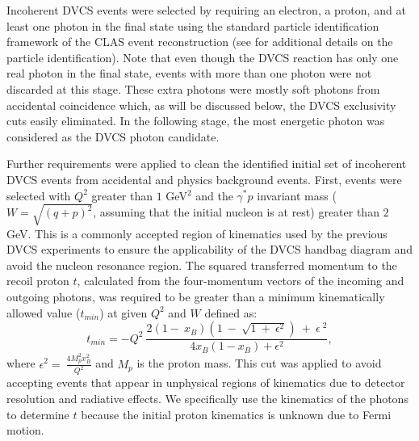 \documentclass[twocolumn,nofootinbib,prl,superscriptaddress,secnumarabic,amssymb,nobibnotes,aps,floatfix]{revtex4}
\begin{document}
Incoherent DVCS events were selected by requiring an electron, a proton, and at 
least one photon in the final state using the standard particle identification 
framework of the CLAS event reconstruction (see \cite{Hattawy:thesis} for 
additional details on the particle identification). Note that even though the 
DVCS reaction has only one real photon in the final state, events with more 
than one photon were not discarded at this stage. These extra photons were 
mostly soft photons from accidental coincidence which, as will be discussed 
below, the DVCS exclusivity cuts easily eliminated.  In the following 
stage, the most energetic photon was considered as the DVCS photon candidate.

Further requirements were applied to clean the identified initial set of 
incoherent DVCS events from accidental and physics background events. 
First, events were selected with $Q^2$ greater than $1$ GeV$^2$ and the 
$\gamma^*p$ invariant mass ($W=\sqrt{(q+p)^2}$, assuming that the initial 
nucleon is at rest) greater than $2$ GeV. This is a commonly accepted region of 
kinematics used by the previous DVCS experiments to ensure the applicability of 
the DVCS handbag diagram and avoid the nucleon resonance region. The squared 
transferred momentum to the recoil proton $t$, calculated from the 
four-momentum vectors of the incoming and outgoing photons, was required to be 
greater than a minimum kinematically allowed value ($t_{min}$) at given $Q^2$ 
and $W$ defined as: \begin{equation}
t_{min} 
   =-Q^{2}~\frac{2(1-~x_{B})(1~-~\sqrt{1~+~\epsilon^{2}})~+~\epsilon~^{2}}{4x_{B}(1-x_{B})+\epsilon^{2}},
\end{equation}
where $\epsilon^{2}=~\frac{4M^{2}_{p}x^{2}_{B}}{Q^{2}}$ and $M_{p}$ is the 
proton mass. This cut was applied to avoid accepting events that appear in  
unphysical regions of kinematics due to detector resolution and radiative 
effects.  We specifically use the kinematics of the photons to determine $t$ 
because the initial proton kinematics is unknown due to Fermi motion. 
\end{document}
